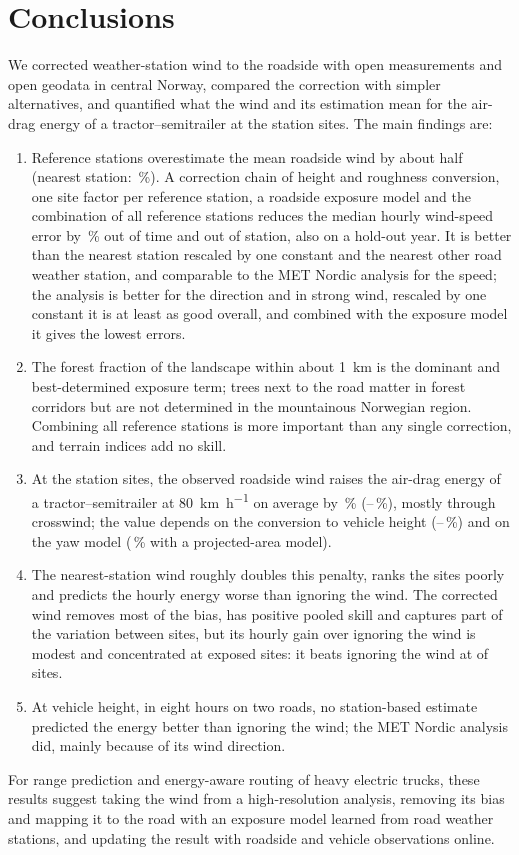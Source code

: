 \section{Conclusions}
\label{sec:conclusions}
We corrected weather-station wind to the roadside with open measurements and open geodata in central Norway, compared the correction with simpler alternatives, and quantified what the wind and its estimation mean for the air-drag energy of a tractor--semitrailer at the station sites. The main findings are:
\begin{enumerate}
\item Reference stations overestimate the mean roadside wind by about half (nearest station: \noSpdBiasAbsRaw\,\%). A correction chain of height and roughness conversion, one site factor per reference station, a roadside exposure model and the combination of all reference stations reduces the median hourly wind-speed error by \noCvRed\,\% out of time and out of station, also on a hold-out year. It is better than the nearest station rescaled by one constant and the nearest other road weather station, and comparable to the MET Nordic analysis for the speed; the analysis is better for the direction and in strong wind, rescaled by one constant it is at least as good overall, and combined with the exposure model it gives the lowest errors.
\item The forest fraction of the landscape within about \SI{1}{km} is the dominant and best-determined exposure term; trees next to the road matter in forest corridors but are not determined in the mountainous Norwegian region. Combining all reference stations is more important than any single correction, and terrain indices add no skill.
\item At the station sites, the observed roadside wind raises the air-drag energy of a tractor--semitrailer at \SI{80}{km.h^{-1}} on average by \enAddNo\,\% (\enAddNoLo--\enAddNoHi\,\%), mostly through crosswind; the value depends on the conversion to vehicle height (\enBandNoLo--\enBandNoHi\,\%) and on the yaw model (\enAddNoMOne\,\% with a projected-area model).
\item The nearest-station wind roughly doubles this penalty, ranks the sites poorly and predicts the hourly energy worse than ignoring the wind. The corrected wind removes most of the bias, has positive pooled skill and captures part of the variation between sites, but its hourly gain over ignoring the wind is modest and concentrated at exposed sites: it beats ignoring the wind at \enStGainNoCor{} of \enNoStations{} sites.
\item At vehicle height, in eight hours on two roads, no station-based estimate predicted the energy better than ignoring the wind; the MET Nordic analysis did, mainly because of its wind direction.
\end{enumerate}
For range prediction and energy-aware routing of heavy electric trucks, these results suggest taking the wind from a high-resolution analysis, removing its bias and mapping it to the road with an exposure model learned from road weather stations, and updating the result with roadside and vehicle observations online.
